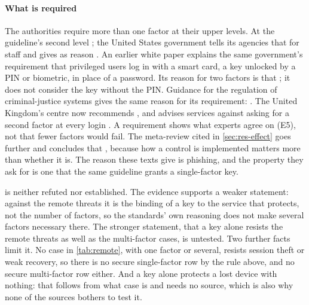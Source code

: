 \paragraph{What is required}
The authorities require more than one factor at their upper levels.
At the guideline's second level
; the United States government
tells its agencies that for staff
and gives as reason
.
An earlier white paper explains the same government's requirement that
privileged users log in with a smart card, a key unlocked by a PIN or
biometric, in place of a password.
Its reason for two factors is that
; it does not
consider the key without the PIN.
Guidance for the regulation of criminal-justice systems gives the same
reason for its requirement:
.
The United Kingdom's centre now recommends
, and advises
services against asking for a second factor at every login
\autocite{NCSC2026Methods}.
A requirement shows what experts agree on (E5), not that fewer factors
would fail.
The meta-review cited in \cref{sec:res-effect} goes further and
concludes that
,
because how a control is implemented matters more than whether it is.
The reason these texts give is phishing, and the property they ask for
is one that the same guideline grants a single-factor key.

 is neither refuted nor established.
The evidence supports a weaker statement: against the remote threats it
is the binding of a key to the service that protects, not the number of
factors, so the standards' own reasoning does not make several factors
necessary there.
The stronger statement, that a key alone resists the remote threats as
well as the multi-factor cases, is untested.
Two further facts limit it.
No case in \cref{tab:remote}, with one factor or several, resists
session theft or weak recovery, so there is no secure single-factor row
by the rule above, and no secure multi-factor row either.
And a key alone protects a lost device with nothing: that follows from
what case  is and needs no source, which is also why none of the
sources bothers to test it.


